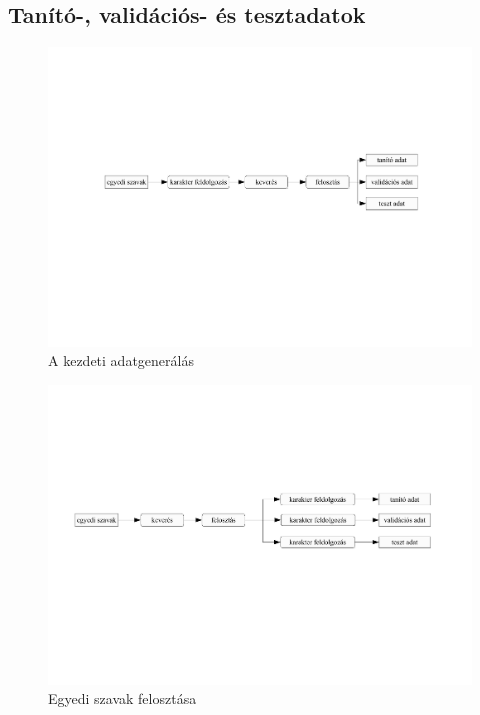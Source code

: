 \documentclass[a4paper, magyar]{article}
\begin{document}
\subsection{Tanító-, validációs- és tesztadatok}
\begin{figure}[htp]
	\includegraphics[trim={0 9cm 0 7cm},clip,
	width=\textwidth]{figures/dataflowdefault.pdf}
	\caption{A kezdeti adatgenerálás}\par\medskip\centering
	\label{fig:dfdef}
\end{figure}
\begin{figure}[htp]
	\includegraphics[trim={0 8cm 0 7cm},clip,
	width=\textwidth]{figures/dataflowuwords.pdf}
	\caption{Egyedi szavak felosztása}\par\medskip\centering
	\label{fig:dfuwords}
\end{figure}
\end{document}
